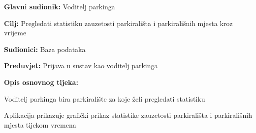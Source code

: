 \noindent {}
\begin{packed_item}
	
	\item \textbf{Glavni sudionik: }Voditelj parkinga
	\item  \textbf{Cilj:} Pregledati statistiku zauzetosti parkirališta i parkirališnih mjesta kroz vrijeme
	\item  \textbf{Sudionici:} Baza podataka
	\item  \textbf{Preduvjet:} Prijava u sustav kao voditelj parkinga
	\item  \textbf{Opis osnovnog tijeka:}
	
	\item[] \begin{packed_enum}
		
		\item Voditelj parkinga bira parkiralište za koje želi pregledati statistiku
		\item Aplikacija prikazuje grafički prikaz statistike zauzetosti parkirališta i parkirališnih mjesta tijekom vremena
		
	\end{packed_enum}
	
\end{packed_item}

